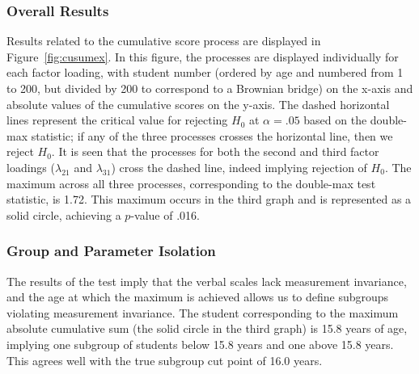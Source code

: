 \documentclass[man]{apa}
\begin{document}
\subsubsection{Overall Results}
Results related to the cumulative score process are displayed in
Figure~\ref{fig:cusumex}.  In this figure, the processes
are displayed individually 
for each factor loading, with student number (ordered by age and
numbered from 1 to 200, but divided by 200 to correspond 
to a Brownian bridge) on the x-axis and
absolute values of the cumulative scores on the y-axis.  The dashed horizontal
lines represent the critical value for rejecting $H_0$ at $\alpha=.05$
based on the double-max statistic; if any of the three processes
crosses the horizontal line, then we reject $H_0$.  It is seen that
the processes for both the second and third factor loadings
($\lambda_{21}$ and $\lambda_{31}$) cross the dashed line, indeed
implying rejection of $H_0$.  The maximum across all three processes,
corresponding to the double-max test statistic, is 1.72.  This maximum
occurs in the third graph and is represented as a solid circle, 
achieving a $p$-value of .016.  



\subsubsection{Group and Parameter Isolation}
The results of the test imply that the 
verbal scales lack measurement invariance, and the age at which the
maximum is achieved allows us to define subgroups violating
measurement invariance.  The student corresponding to the maximum
absolute cumulative sum (the solid circle in the third graph) is 15.8
years of age, implying one subgroup of 
students below 15.8 years and one above 15.8 years.  This agrees well
with the true subgroup cut point of 16.0 years.
\end{document}
